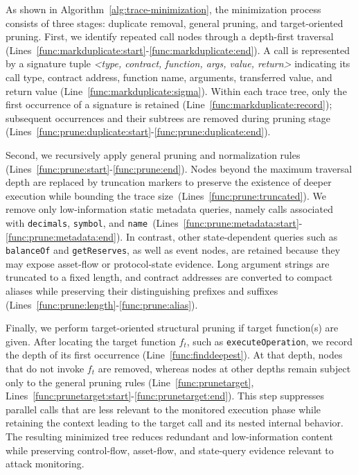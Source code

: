 As shown in Algorithm~\ref{alg:trace-minimization}, the minimization process consists of three stages: duplicate removal, general pruning, and target-oriented pruning.
First, we identify repeated call nodes through a depth-first traversal (Lines~\ref{func:markduplicate:start}-\ref{func:markduplicate:end}). A call is represented by a signature tuple \emph{<type, contract, function, args, value, return>} indicating its call type, contract address, function name, arguments, transferred value, and return value (Line~\ref{func:markduplicate:sigma}). Within each trace tree, only the first occurrence of a signature is retained (Line~\ref{func:markduplicate:record}); subsequent occurrences and their subtrees are removed during pruning stage (Lines~\ref{func:prune:duplicate:start}-\ref{func:prune:duplicate:end}).

Second, we recursively apply general pruning and normalization rules (Lines~\ref{func:prune:start}-\ref{func:prune:end}). Nodes beyond the maximum traversal depth are replaced by truncation markers to preserve the existence of deeper execution while bounding the trace size~(Lines~\ref{func:prune:truncated}). We remove only low-information static metadata queries, namely calls associated with \texttt{decimals}, \texttt{symbol}, and \texttt{name}~(Lines~\ref{func:prune:metadata:start}-\ref{func:prune:metadata:end}). In contrast, other state-dependent queries such as \texttt{balanceOf} and \texttt{getReserves}, as well as event nodes, are retained because they may expose asset-flow or protocol-state evidence. 
Long argument strings are truncated to a fixed length, and contract addresses are converted to compact aliases while preserving their distinguishing prefixes and suffixes (Lines~\ref{func:prune:length}-\ref{func:prune:alias}).

Finally, we perform target-oriented structural pruning if target function(s) are given. After locating the target function \(f_t\), such as \texttt{executeOperation}, we record the depth of its first occurrence (Line~\ref{func:finddeepest}). At that depth, nodes that do not invoke \(f_t\) are removed, whereas nodes at other depths remain subject only to the general pruning rules (Line~\ref{func:prunetarget}, Lines~\ref{func:prunetarget:start}-\ref{func:prunetarget:end}). This step suppresses parallel calls that are less relevant to the monitored execution phase while retaining the context leading to the target call and its nested internal behavior. The resulting minimized tree reduces redundant and low-information content while preserving control-flow, asset-flow, and state-query evidence relevant to attack monitoring.


